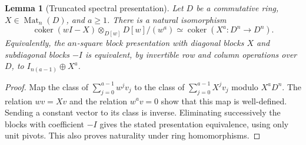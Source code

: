 \documentclass[11pt,reqno]{amsart}
\numberwithin{equation}{section}
\newtheorem{lemma}[theorem]{Lemma}
\theoremstyle{definition}\newtheorem{definition}[theorem]{Definition}
\theoremstyle{remark}\newtheorem{remark}[theorem]{Remark}
\DeclareMathOperator{\coker}{coker}\DeclareMathOperator{\codim}{codim}
\begin{document}
\begin{lemma}[Truncated spectral presentation]
\label{lem:truncated-spectral-presentation}
Let \(D\) be a commutative ring, \(X\in\operatorname{Mat}_n(D)\),
and \(a\ge1\).  There is a natural isomorphism
\begin{equation}\label{eq:truncated-module-power}
 \coker(wI-X)\otimes_{D[w]}D[w]/(w^a)
                  \simeq \coker(X^a:D^n\to D^n).
\end{equation}
Equivalently, the \(an\)-square block presentation with diagonal
blocks \(X\) and subdiagonal blocks \(-I\) is equivalent, by
invertible row and column operations over \(D\), to
\(I_{n(a-1)}\oplus X^a\).
\end{lemma}
\begin{proof}
Map the class of \(\sum_{j=0}^{a-1}w^jv_j\) to the class of
\(\sum_{j=0}^{a-1}X^jv_j\) modulo \(X^aD^n\).
The relation \(wv=Xv\) and the relation \(w^av=0\) show that
this map is well-defined.  Sending a constant vector to its class
is inverse.  Eliminating successively the blocks with coefficient
\(-I\) gives the stated presentation equivalence, using only unit
pivots.  This also proves naturality under ring homomorphisms.
\end{proof}
\end{document}
